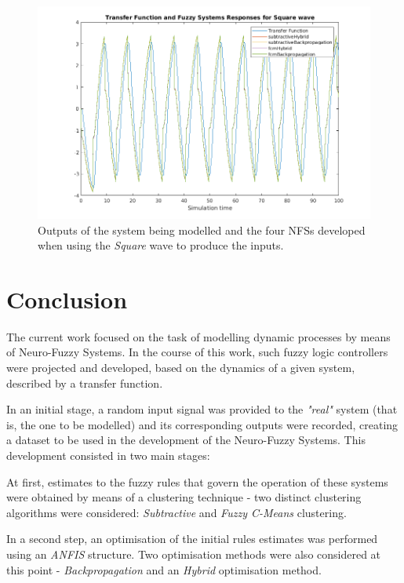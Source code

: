 \documentclass[11pt]{article}
\begin{document}
\begin{figure}[H]
	\centering
	\includegraphics[scale=0.5]{images/assessment_square.png}
	\caption{Outputs of the system being modelled and the four NFSs developed when using the \emph{Square} wave to produce the inputs.}
	\label{results_square}
\end{figure}


\section{Conclusion}
\label{conclusion}

The current work focused on the task of modelling dynamic processes by means of Neuro-Fuzzy Systems. In the course of this work, such fuzzy logic controllers were projected and developed, based on the dynamics of a given system, described by a transfer function.

In an initial stage, a random input signal was provided to the \emph{"real"} system (that is, the one to be modelled) and its corresponding outputs were recorded, creating a dataset to be used in the development of the Neuro-Fuzzy Systems. This development consisted in two main stages:

At first, estimates to the fuzzy rules that govern the operation of these systems were obtained by means of a clustering technique - two distinct clustering algorithms were considered: \emph{Subtractive} and \emph{Fuzzy C-Means} clustering.

In a second step, an optimisation of the initial rules estimates was performed using an \emph{ANFIS} structure. Two optimisation methods were also considered at this point - \emph{Backpropagation} and an \emph{Hybrid} optimisation method.
\end{document}

